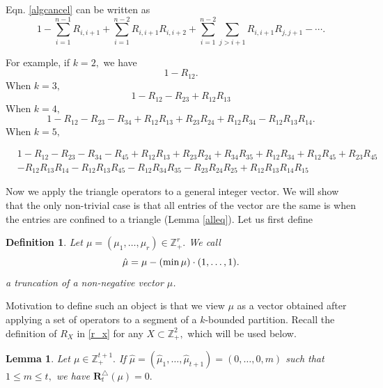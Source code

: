 \documentclass[11pt]{amsart}
\newtheorem{lemma}[theorem]{Lemma}
\newtheorem{definition}[theorem]{Definition}
\newcommand{\tn}[1]{\textnormal{#1}}
\begin{document}
 Eqn. \eqref{algcancel} can be written as
 \[1- \sum_{i=1}^{n-1} R_{i,i+1} + \sum_{i=1}^{n-2} R_{i,i+1}R_{i,i+2} + \sum_{i=1}^{n-2} \sum_{j > i+1} R_{i,i+1}R_{j,j+1}-\cdots. \]

For example, if $k=2,$ we have
 \[1-R_{12}.\]
When $k=3,$
\[1-R_{12}-R_{23}+R_{12}R_{13}\]
When $k=4,$
\[1-R_{12}-R_{23}-R_{34}+R_{12}R_{13}+R_{23}R_{24}+R_{12}R_{34}-R_{12}R_{13}R_{14}. \]
When $k=5,$

\begin{equation*}
\begin{split}
& 1-R_{12}-R_{23}-R_{34}-R_{45}+R_{12}R_{13}+R_{23}R_{24}+R_{34}R_{35}+R_{12}R_{34}+R_{12}R_{45}+R_{23}R_{45} \\
&-R_{12}R_{13}R_{14}-R_{12}R_{13}R_{45}-R_{12}R_{34}R_{35}-R_{23}R_{24}R_{25}+R_{12}R_{13}R_{14}R_{15}
\end{split}
\end{equation*}


Now we apply the triangle operators to a general integer vector. We will show that the only non-trivial case is that all entries of the vector are the same is when the entries are confined to a triangle (Lemma \ref{alleq}). Let us first define
\begin{definition} \label{trunc}
    Let $\mu=(\mu_1,\ldots,\mu_r) \in  \mathbb{Z}^{r}_+.$ We call
\[\hat{\mu}=\mu-(\tn{min} \, \mu) \cdot (1,\ldots,1).\]
a truncation of a non-negative vector $\mu$. 
\end{definition}
Motivation to define such an object is that we view $\mu$ as a vector obtained after applying a set of operators to a segment of a $k$-bounded partition. Recall the definition of $R_X$ in \eqref{r_x} for any $X \subset \mathbb{Z}^2_{+},$ which will be used below.

\begin{lemma} \label{triangle-lemma}
Let $\mu \in \mathbb{Z}_+^{t+1}.$ If $\hat{\mu}=(\hat{\mu}_1,\ldots,\hat{\mu}_{t+1})=(0,\ldots,0,m)$ such that $1 \leq m \leq t,$ we have $\mathbf{R}^\triangle_{t}(\mu)=0.$ 
\end{lemma}
\end{document}
